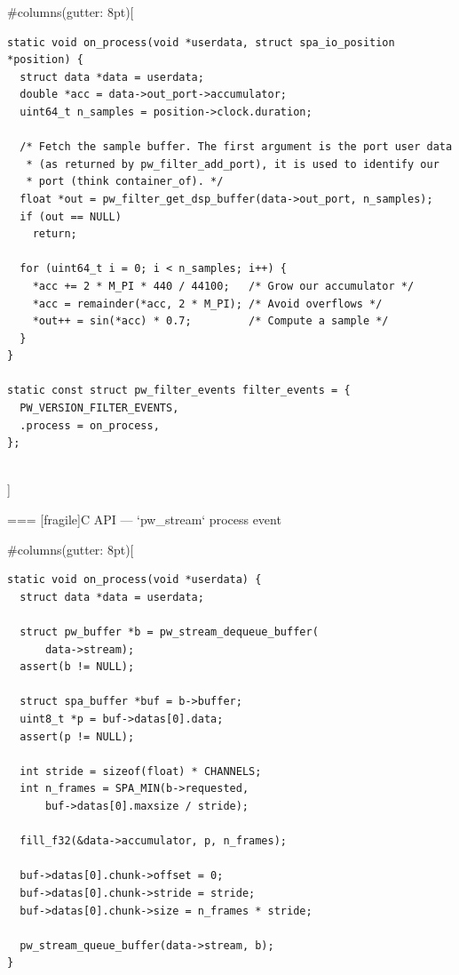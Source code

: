 #columns(gutter: 8pt)[
      \begin{block}{}
        \fontsize{8}{8}\selectfont
          \begin{verbatim}
static void on_process(void *userdata, struct spa_io_position *position) {
  struct data *data = userdata;
  double *acc = data->out_port->accumulator;
  uint64_t n_samples = position->clock.duration;

  /* Fetch the sample buffer. The first argument is the port user data
   * (as returned by pw_filter_add_port), it is used to identify our
   * port (think container_of). */
  float *out = pw_filter_get_dsp_buffer(data->out_port, n_samples);
  if (out == NULL)
    return;

  for (uint64_t i = 0; i < n_samples; i++) {
    *acc += 2 * M_PI * 440 / 44100;   /* Grow our accumulator */
    *acc = remainder(*acc, 2 * M_PI); /* Avoid overflows */
    *out++ = sin(*acc) * 0.7;         /* Compute a sample */
  }
}

static const struct pw_filter_events filter_events = {
  PW_VERSION_FILTER_EVENTS,
  .process = on_process,
};
          \end{verbatim}
        \end{block}
  \\]




=== [fragile]{C API — `pw_stream` process event}
  
#columns(gutter: 8pt)[
      \begin{block}{}
        \fontsize{8}{8}\selectfont
          \begin{verbatim}
static void on_process(void *userdata) {
  struct data *data = userdata;

  struct pw_buffer *b = pw_stream_dequeue_buffer(
      data->stream);
  assert(b != NULL);

  struct spa_buffer *buf = b->buffer;
  uint8_t *p = buf->datas[0].data;
  assert(p != NULL);

  int stride = sizeof(float) * CHANNELS;
  int n_frames = SPA_MIN(b->requested,
      buf->datas[0].maxsize / stride);

  fill_f32(&data->accumulator, p, n_frames);

  buf->datas[0].chunk->offset = 0;
  buf->datas[0].chunk->stride = stride;
  buf->datas[0].chunk->size = n_frames * stride;

  pw_stream_queue_buffer(data->stream, b);
}
          \end{verbatim}
        \end{block}

